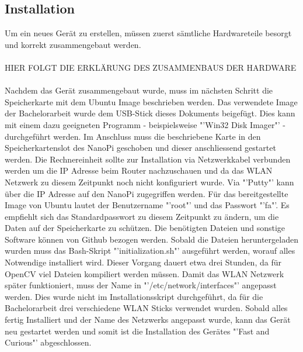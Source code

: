 \subsection{Installation}
Um ein neues Gerät zu erstellen, müssen zuerst sämtliche Hardwareteile besorgt und korrekt zusammengebaut werden.\\\\

HIER FOLGT DIE ERKLÄRUNG DES ZUSAMMENBAUS DER HARDWARE\\\\


Nachdem das Gerät zusammengebaut wurde, muss im nächsten Schritt die Speicherkarte mit dem Ubuntu Image beschrieben werden. Das verwendete Image der Bachelorarbeit wurde dem USB-Stick dieses Dokuments beigefügt. Dies kann mit einem dazu geeigneten Programm - beispielsweise "'Win32 Disk Imager"' - durchgeführt werden. Im Anschluss muss die beschriebene Karte in den Speicherkartenslot des NanoPi geschoben und dieser anschliessend gestartet werden. Die Rechnereinheit sollte zur Installation via Netzwerkkabel verbunden werden um die IP Adresse beim Router nachzuschauen und da das WLAN Netzwerk zu diesem Zeitpunkt noch nicht konfiguriert wurde. Via "'Putty"' kann über die IP Adresse auf den NanoPi zugegriffen werden. Für das bereitgestellte Image von Ubuntu lautet der Benutzername "'root"' und das Passwort "'fa"'. Es empfiehlt sich das Standardpasswort zu diesem Zeitpunkt zu ändern, um die Daten auf der Speicherkarte zu schützen. Die benötigten Dateien und sonstige Software können von Github bezogen werden. Sobald die Dateien heruntergeladen wurden muss das Bash-Skript "'initialization.sh"' ausgeführt werden, worauf alles Notwendige installiert wird. Dieser Vorgang dauert etwa drei Stunden, da für OpenCV viel Dateien kompiliert werden müssen.
Damit das WLAN Netzwerk später funktioniert, muss der Name in "'/etc/network/interfaces"' angepasst werden. Dies wurde nicht im Installationsskript durchgeführt, da für die Bachelorarbeit drei verschiedene WLAN Sticks verwendet wurden. Sobald alles fertig Installiert und der Name des Netzwerks angepasst wurde, kann das Gerät neu gestartet werden und somit ist die Installation des Gerätes "'Fast and Curious"' abgeschlossen.